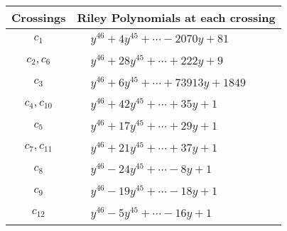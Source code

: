 \documentclass[1p]{elsarticle_modified}
\theoremstyle{definition}
\begin{document}
\begin{tabular}{m{50pt}|m{274pt}}
Crossings & \hspace{64pt}Riley Polynomials at each crossing \\
\hline $$\begin{aligned}c_{1}\end{aligned}$$&$\begin{aligned}
&y^{46}+4 y^{45}+\cdots-2070 y+81
\end{aligned}$\\
\hline $$\begin{aligned}c_{2},c_{6}\end{aligned}$$&$\begin{aligned}
&y^{46}+28 y^{45}+\cdots+222 y+9
\end{aligned}$\\
\hline $$\begin{aligned}c_{3}\end{aligned}$$&$\begin{aligned}
&y^{46}+6 y^{45}+\cdots+73913 y+1849
\end{aligned}$\\
\hline $$\begin{aligned}c_{4},c_{10}\end{aligned}$$&$\begin{aligned}
&y^{46}+42 y^{45}+\cdots+35 y+1
\end{aligned}$\\
\hline $$\begin{aligned}c_{5}\end{aligned}$$&$\begin{aligned}
&y^{46}+17 y^{45}+\cdots+29 y+1
\end{aligned}$\\
\hline $$\begin{aligned}c_{7},c_{11}\end{aligned}$$&$\begin{aligned}
&y^{46}+21 y^{45}+\cdots+37 y+1
\end{aligned}$\\
\hline $$\begin{aligned}c_{8}\end{aligned}$$&$\begin{aligned}
&y^{46}-24 y^{45}+\cdots-8 y+1
\end{aligned}$\\
\hline $$\begin{aligned}c_{9}\end{aligned}$$&$\begin{aligned}
&y^{46}-19 y^{45}+\cdots-18 y+1
\end{aligned}$\\
\hline $$\begin{aligned}c_{12}\end{aligned}$$&$\begin{aligned}
&y^{46}-5 y^{45}+\cdots-16 y+1
\end{aligned}$\\
\hline
\end{tabular}\\~\\
\end{document}
